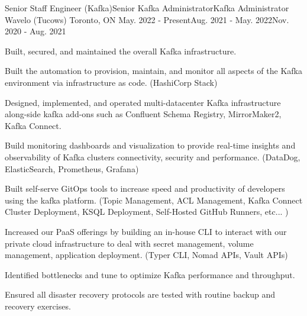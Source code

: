 


\begin{cventries}

\cventry
{ Senior Staff Engineer (Kafka)\newline Senior Kafka Administrator\newline Kafka Administrator} %
{Wavelo (Tucows)} %
{Toronto, ON} %
{May. 2022 - Present\newline Aug. 2021 - May. 2022\newline Nov. 2020 - Aug. 2021} %
{ %
\begin{cvitems}
\item {Built, secured, and maintained the overall Kafka infrastructure.}
\item {Built the automation to provision, maintain, and monitor all aspects of the Kafka environment via infrastructure as code. (HashiCorp Stack)}
\item {Designed, implemented, and operated multi-datacenter Kafka infrastructure along-side kafka add-ons such as Confluent Schema Registry, MirrorMaker2, Kafka Connect.}
\item {Build monitoring dashboards and visualization to provide real-time insights and observability of Kafka clusters connectivity, security and performance. (DataDog, ElasticSearch, Prometheus, Grafana)}
\item {Built self-serve GitOps tools to increase speed and productivity of developers using the kafka platform. (Topic Management, ACL Management, Kafka Connect Cluster Deployment, KSQL Deployment, Self-Hosted GitHub Runners, etc... )}
\item {Increased our PaaS offerings by building an in-house CLI to interact with our private cloud infrastructure to deal with secret management, volume management, application deployment. (Typer CLI, Nomad APIs, Vault APIs)}
\item {Identified bottlenecks and tune to optimize Kafka performance and throughput.}
\item {Ensured all disaster recovery protocols are tested with routine backup and recovery exercises.}
\end{cvitems}
}


\end{cventries}
